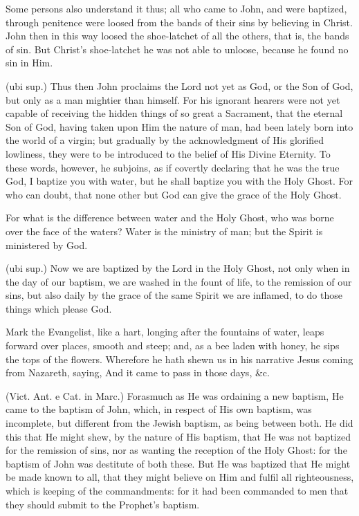  Some persons also understand it thus; all who came to John, and were baptized, through penitence were loosed from the bands of their sins by believing in Christ. John then in this way loosed the shoe-latchet of all the others, that is, the bands of sin. But Christ’s shoe-latchet he was not able to unloose, because he found no sin in Him.

 (ubi sup.) Thus then John proclaims the Lord not yet as God, or the Son of God, but only as a man mightier than himself. For his ignorant hearers were not yet capable of receiving the hidden things of so great a Sacrament, that the eternal Son of God, having taken upon Him the nature of man, had been lately born into the world of a virgin; but gradually by the acknowledgment of His glorified lowliness, they were to be introduced to the belief of His Divine Eternity. To these words, however, he subjoins, as if covertly declaring that he was the true God, I baptize you with water, but he shall baptize you with the Holy Ghost. For who can doubt, that none other but God can give the grace of the Holy Ghost.

 For what is the difference between water and the Holy Ghost, who was borne over the face of the waters? Water is the ministry of man; but the Spirit is ministered by God.

 (ubi sup.) Now we are baptized by the Lord in the Holy Ghost, not only when in the day of our baptism, we are washed in the fount of life, to the remission of our sins, but also daily by the grace of the same Spirit we are inflamed, to do those things which please God.

 

 Mark the Evangelist, like a hart, longing after the fountains of water, leaps forward over places, smooth and steep; and, as a bee laden with honey, he sips the tops of the flowers. Wherefore he hath shewn us in his narrative Jesus coming from Nazareth, saying, And it came to pass in those days, \&c.

 (Vict. Ant. e Cat. in Marc.) Forasmuch as He was ordaining a new baptism, He came to the baptism of John, which, in respect of His own baptism, was incomplete, but different from the Jewish baptism, as being between both. He did this that He might shew, by the nature of His baptism, that He was not baptized for the remission of sins, nor as wanting the reception of the Holy Ghost: for the baptism of John was destitute of both these. But He was baptized that He might be made known to all, that they might believe on Him and fulfil all righteousness, which is keeping of the commandments: for it had been commanded to men that they should submit to the Prophet’s baptism.

